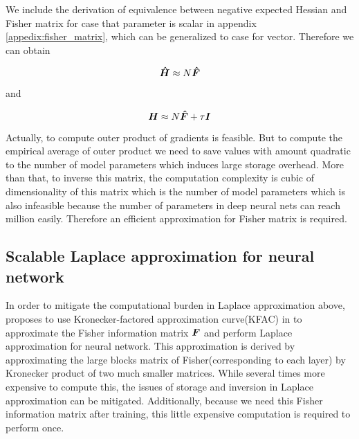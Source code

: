 We include the derivation of equivalence between negative expected Hessian and Fisher matrix for case that parameter is scalar in appendix \ref{appedix:fisher_matrix}, which can be generalized to case for vector.
Therefore we can obtain 

\begin{equation} \label{fisher hessian}
\boldsymbol{\hat{H}} \approx N\boldsymbol{\hat{F}}
\end{equation}

and
 
\begin{equation} \label{fisher hessian_with_prior}
\boldsymbol H \approx N\boldsymbol{\hat F} + \tau \mathcal {\boldsymbol I}
\end{equation}

Actually, to compute outer product of gradients is feasible. But to compute the empirical average of outer product we need to save values with amount quadratic to the number of model parameters which induces large storage overhead. More than that, to inverse this matrix, the computation complexity is cubic of dimensionality of this matrix which is the number of model parameters which is also infeasible because the number of parameters in deep neural nets can reach million easily. Therefore an efficient approximation for Fisher matrix is required. 

\subsection{Scalable Laplace approximation for neural network}
In order to mitigate the computational burden in Laplace approximation above, \cite{ritter2018scalable} proposes to use Kronecker-factored approximation curve(KFAC) in \cite{martens2015optimizing} to approximate the Fisher information matrix $\boldsymbol F$ and perform Laplace approximation for neural network. This approximation is derived by approximating the large blocks matrix of Fisher(corresponding to each layer) by Kronecker product of two much smaller matrices. While several times more expensive to compute this, the issues of storage and inversion in Laplace approximation can be mitigated. Additionally, because we need this Fisher information matrix after training, this little expensive computation is required to perform once.

